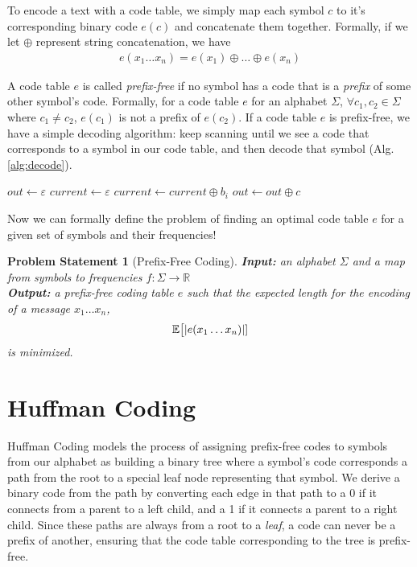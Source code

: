 \documentclass[10pt, twocolumn]{article}
\DeclarePairedDelimiter\length{\lvert}{\rvert}
\theoremstyle{prob}
\newtheorem*{probstate}{Problem Statement}
\theoremstyle{definition}
\begin{document}
To encode a text with a code table, we simply map each symbol $c$ to it's corresponding binary code $e(c)$ and concatenate them together. Formally, if we let $\oplus$ represent string concatenation, we have
\begin{align*}
    e(x_1\dots x_n) = e(x_1) \oplus \dots \oplus e(x_n)
\end{align*}

A code table $e$ is called \textit{prefix-free} if no symbol has a code that is a \textit{prefix} of some other symbol's code. Formally, for a code table $e$ for an alphabet $\Sigma$, $\forall c_1, c_2 \in \Sigma$ where $c_1 \neq c_2$, $e(c_1)$ is not a prefix of $e(c_2)$. If a code table $e$ is prefix-free, we have a simple decoding algorithm: keep scanning until we see a code that corresponds to a symbol in our code table, and then decode that symbol (Alg. \ref{alg:decode}).

\begin{algorithm*}
\begin{algorithmic}
        \State $out \gets \varepsilon$
        \State $current \gets \varepsilon$
            \State $current \gets current \oplus b_i$
                \State $out \gets out \oplus c$
            \EndIf
        \EndFor
    \EndFunction
\end{algorithmic}
\caption{A decoding scheme given a prefix-free coding table}
\label{alg:decode}
\end{algorithm*}
Now we can formally define the problem of finding an optimal code table $e$ for a given set of symbols and their frequencies!

\begin{probstate}[Prefix-Free Coding]
    \textbf{Input:} an alphabet $\Sigma$ and a map from symbols to frequencies $f: \Sigma \to \mathbb{R}$ \\
    \textbf{Output:} a prefix-free coding table $e$ such that the expected length for the encoding of a message $x_1\dots x_n$,     
    \begin{align*}
        \mathbb{E}\bigr[\length{e(x_1\dots x_n)}]
    \end{align*} is minimized. 
\end{probstate}

\section{Huffman Coding}
    Huffman Coding models the process of assigning prefix-free codes to symbols from our alphabet as building a binary tree where a symbol's code corresponds a path from the root to a special leaf node representing that symbol. We derive a binary code from the path by converting each edge in that path to a 0 if it connects from a parent to a left child, and a 1 if it connects a parent to a right child. Since these paths are always from a root to a \textit{leaf}, a code can never be a prefix of another, ensuring that the code table corresponding to the tree is prefix-free.
\end{document}
